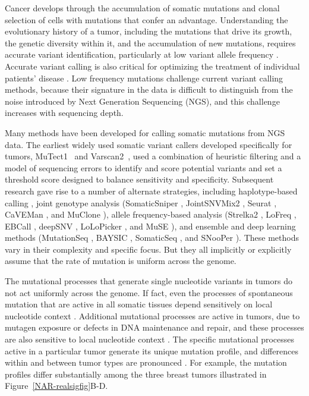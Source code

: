 \documentclass[a4,center,fleqn]{NAR}
\begin{document}
Cancer develops through the accumulation of somatic mutations and clonal selection of cells with mutations that confer an advantage.
Understanding the evolutionary history of a tumor, including the mutations that drive its growth, the genetic diversity within it, and the accumulation of new mutations, requires accurate variant identification, particularly at low variant allele frequency \cite{Williams2016,Bozic2016,Williams2018,Shi2018}.
Accurate variant calling is also critical for optimizing the treatment of individual patients' disease \cite{Ding2012,Mardis2012,Chen2013,Borad2014,Findlay2016}.
Low frequency mutations challenge current variant calling methods, because their signature in the data is difficult to distinguish from the noise introduced by Next Generation Sequencing (NGS), and this challenge increases with sequencing depth.

Many methods have been developed for calling somatic mutations from NGS data.
The earliest widely used somatic variant callers developed specifically for tumors, MuTect1~\cite{Cibulskis2013} and Varscan2~\cite{Koboldt2012}, used a combination of heuristic filtering and a model of sequencing errors to identify and score potential variants and set a threshold score designed to balance sensitivity and specificity.
Subsequent research gave rise to a number of alternate strategies, including haplotype-based calling \cite{Garrison2012},
joint genotype analysis (SomaticSniper \cite{Larson2012}, JointSNVMix2 \cite{Roth2012}, Seurat \cite{Christoforides2013}, CaVEMan \cite{Jones2016}, and MuClone \cite{Dorri2019}), allele frequency-based analysis (Strelka2 \cite{Kim2018}, LoFreq \cite{Wilm2012}, EBCall \cite{Shiraishi2013b}, deepSNV \cite{Gerstung2012}, LoLoPicker \cite{Carrot-Zhang2017}, and MuSE \cite{Fan2016}), and ensemble and deep learning methods (MutationSeq \cite{Ding2012}, BAYSIC \cite{Cantarel2014}, SomaticSeq \cite{Fang2015}, and SNooPer \cite{Spinella2016}).
These methods vary in their complexity and specific focus.
But they all implicitly or explicitly assume that the rate of mutation is uniform across the genome.

The mutational processes that generate single nucleotide variants in tumors do not act uniformly across the genome.
If fact, even the processes of spontaneous mutation that are active in all somatic tissues depend sensitively on local nucleotide context \cite{Nik-Zainal2012a,Alexandrov2015,Lee-Six2018}. 
Additional mutational processes are active in tumors, due to mutagen exposure or defects in DNA maintenance and repair, and these processes are also sensitive to local nucleotide context \cite{Alexandrov2013a,Helleday2014a,Nik-Zainal2016,Kandoth2013,Alexandrov2016}.
The specific mutational processes active in a particular tumor generate its unique mutation profile, and differences within and between tumor types are pronounced \cite{Stephens2005, Burrell2013a, Nakamura2015, Witkiewicz2015, Kumar2016}.
For example, the mutation profiles differ substantially among the three breast tumors illustrated in Figure~\ref{NAR-realsigfig}B-D.
\end{document}
